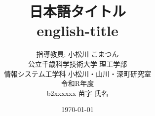 \documentclass[12pt, a4paper]{ujreport} %
\begin{document}
\title{日本語タイトル\\
  english-title}
\author{指導教員: 小松川 こまつん\\
  公立千歳科学技術大学 理工学部\\
  情報システム工学科 小松川・山川・深町研究室\\
  令和R年度\\
  b2xxxxxx 苗字 氏名}
\date{\today} %
\maketitle %
\tableofcontents %

\end{document}
